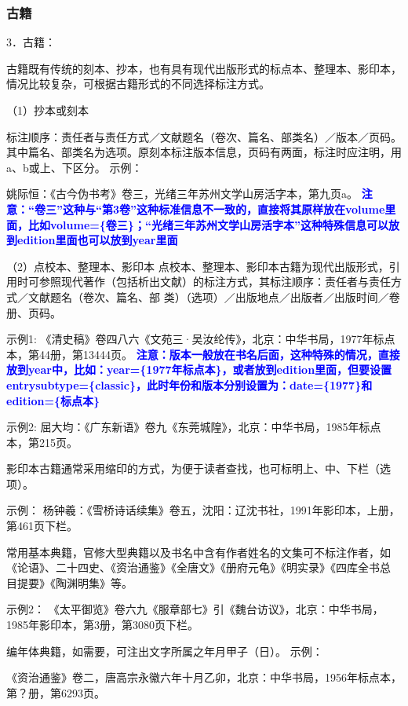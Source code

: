 \documentclass{article}
\newcommand{\qd}[1]{\textbf{\textcolor{blue}{#1}}}
\begin{document}
\subsubsection{古籍}
3．古籍：

古籍既有传统的刻本、抄本，也有具有现代出版形式的标点本、整理本、影印本，情况比较复杂，可根据古籍形式的不同选择标注方式。

（1）抄本或刻本

标注顺序：责任者与责任方式／文献题名（卷次、篇名、部类名）／版本／页码。其中篇名、部类名为选项。原刻本标注版本信息，页码有两面，标注时应注明，用
a、b或上、下区分。
示例：

姚际恒：《古今伪书考》卷三，光绪三年苏州文学山房活字本，第九页a。
\qd{注意：“卷三”这种与“第3卷”这种标准信息不一致的，直接将其原样放在volume里面，比如volume=\{卷三\}；“光绪三年苏州文学山房活字本”这种特殊信息可以放到edition里面也可以放到year里面}

（2）点校本、整理本、影印本
点校本、整理本、影印本古籍为现代出版形式，引用时可参照现代著作（包括析出文献）的标注方式，其标注顺序：责任者与责任方式／文献题名（卷次、篇名、部
类）（选项）／出版地点／出版者／出版时间／卷册、页码。

示例1:
《清史稿》卷四八六《文苑三·吴汝纶传》，北京：中华书局，1977年标点本，第44册，第13444页。
\qd{注意：版本一般放在书名后面，这种特殊的情况，直接放到year中，比如：year=\{1977年标点本\}，或者放到edition里面，但要设置entrysubtype=\{classic\}，此时年份和版本分别设置为：date=\{1977\}和edition=\{标点本\}}

示例2:
屈大均：《广东新语》卷九《东莞城隍》，北京：中华书局，1985年标点本，第215页。

影印本古籍通常采用缩印的方式，为便于读者查找，也可标明上、中、下栏（选项）。

示例：
杨钟羲：《雪桥诗话续集》卷五，沈阳：辽沈书社，1991年影印本，上册，第461页下栏。

常用基本典籍，官修大型典籍以及书名中含有作者姓名的文集可不标注作者，如《论语》、二十四史、《资治通鉴》《全唐文》《册府元龟》《明实录》《四库全书总
目提要》《陶渊明集》等。

示例2：
《太平御览》卷六九《服章部七》引《魏台访议》，北京：中华书局，1985年影印本，第3册，第3080页下栏。

编年体典籍，如需要，可注出文字所属之年月甲子（日）。
示例：

《资治通鉴》卷二，唐高宗永徽六年十月乙卯，北京：中华书局，1956年标点本，第？册，第6293页。
\end{document}
